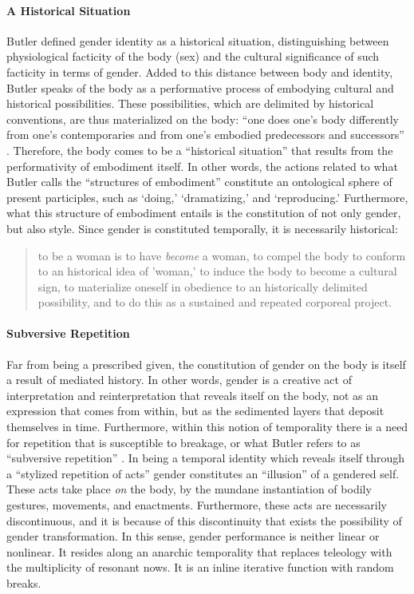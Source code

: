 \paragraph{A Historical Situation}
Butler defined gender identity as a historical situation, distinguishing between physiological facticity of the body (sex) and the cultural significance of such facticity in terms of gender. Added to this distance between body and identity, Butler speaks of the body as a performative process of embodying cultural and historical possibilities. These possibilities, which are delimited by historical conventions, are thus materialized on the body: ``one does one's body differently from one's contemporaries and from one's embodied predecessors and successors'' \parencite[521]{But88:Per}. Therefore, the body comes to be a ``historical situation'' that results from the performativity of embodiment itself. In other words, the actions related to what Butler calls the ``structures of embodiment'' constitute an ontological sphere of present participles, such as `doing,' `dramatizing,' and `reproducing.' Furthermore, what this structure of embodiment entails is the constitution of not only gender, but also style. Since gender is constituted temporally, it is necessarily historical:

\begin{quote}
	to be a woman is to have \textit{become} a woman, to compel the body to conform to an historical idea of 'woman,' to induce the body to become a cultural sign, to materialize oneself in obedience to an historically delimited possibility, and to do this as a sustained and repeated corporeal project. \parencite[521]{But88:Per}
\end{quote}

\paragraph{Subversive Repetition}
Far from being a prescribed given, the constitution of gender on the body is itself a result of mediated history. In other words, gender is a creative act of interpretation and reinterpretation that reveals itself on the body, not as an expression that comes from within, but as the sedimented layers that deposit themselves in time. Furthermore, within this notion of temporality there is a need for repetition that is susceptible to breakage, or what Butler refers to as ``subversive repetition'' \parencite[520]{But88:Per}. In being a temporal identity which reveals itself through a ``stylized repetition of acts'' gender constitutes an ``illusion'' of a gendered self. These acts take place \textit{on} the body, by the mundane instantiation of bodily gestures, movements, and enactments. Furthermore, these acts are necessarily discontinuous, and it is because of this discontinuity that exists the possibility of gender transformation. In this sense, gender performance is neither linear or nonlinear. It resides along an anarchic temporality that replaces teleology with the multiplicity of resonant nows. It is an inline iterative function with random breaks. 

